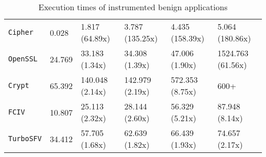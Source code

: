\begin{sidewaystable}
\begin{tabularx}{\linewidth}{*{6}{Y}}
\texttt{Cipher} & 0.028 & 1.817 (64.89x) & 3.787 (135.25x) & 4.435 (158.39x) & 5.064 (180.86x)       \\
\texttt{OpenSSL} & 24.769 & 33.183 (1.34x) & 34.308 (1.39x) & 47.006 (1.90x) & 1524.763 (61.56x)      \\
\texttt{Crypt} & 65.392 & 140.048 (2.14x) & 142.979 (2.19x) & 572.353 (8.75x) & 600+      \\
\texttt{FCIV} & 10.807 & 25.113 (2.32x) & 28.144 (2.60x) & 56.329 (5.21x) & 87.948 (8.14x)       \\
\texttt{TurboSFV} & 34.412 & 57.705 (1.68x) & 62.639 (1.82x) & 66.439 (1.93x) & 74.657 (2.17x)
\\
\hline
\end{tabularx}
\vspace{0.2cm}
\caption{Execution times of instrumented benign applications}

\end{sidewaystable}

